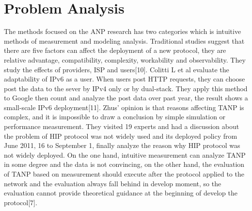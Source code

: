 \documentclass{article}
\begin{document}
\section{Problem Analysis}
The methods focused on the ANP research has two categories which is intuitive methods of measurement and modeling 
analysis. Traditional studies suggest that there are five factors can affect the deployment of a new protocol, 
they are relative advantage, compatibility, complexity, workability and observability. They study the effects of 
providers, ISP and users[10]. Colitti L et al evaluate the adaptability of IPv6 as a user. When users post HTTP requests, 
they can choose post the data to the sever by IPv4 only or by dual-stack. They apply this method to Google then count and 
analyze the post data over past year,  the result shows a small-scale IPv6 deployment[11]. Zhus' opinion is that reasons 
affecting TANP is complex, and it is impossible to draw a conclusion by simple simulation or performance measurement. They 
visited 19 experts and had a discussion about the problem of HIP protocol was not widely used and its deployed policy from 
June 2011, 16 to September 1, finally analyze the reason why HIP protocol was not widely deployed.  On the one hand, intuitive 
measurement can analyze TANP in some degree and the data is not convincing,  on the other hand, the evaluation of TANP based on 
measurement should execute after the protocol applied to the network and the evaluation always fall behind in develop moment, 
so the evaluation cannot provide theoretical guidance at the beginning of develop the protocol[7].
\end{document}
